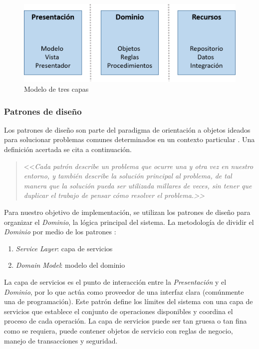 \begin{figure}[h]
\begin{centering}
\includegraphics[width=0.8\columnwidth]{capitulo-5/graphics/arqui_tres_capas}
\par\end{centering}
\caption[Modelo de tres capas]{\label{fig5:tres_capas}Modelo de tres capas}

\end{figure}


\subsubsection{Patrones de diseño}

Los patrones de diseño son parte del paradigma de orientación a objetos
ideados para solucionar problemas comunes determinados en un contexto
particular \cite{Shalloway2004}. Una definición acertada se cita
a continuación.
\begin{quotation}
<<\emph{Cada patrón describe un problema que ocurre una y otra vez
en nuestro entorno, y también describe la solución principal al problema,
de tal manera que la solución pueda ser utilizada millares de veces,
sin tener que duplicar el trabajo de pensar cómo resolver el problema.>>}
\cite{Alexander1977}
\end{quotation}
Para nuestro objetivo de implementación, se utilizan los patrones
de diseño para organizar el \emph{Dominio}, la lógica principal del
sistema. La metodología de dividir el\emph{ Dominio} por medio de
los patrones \cite{Fowler2002}:
\begin{enumerate}
\item \emph{Service Layer}: capa de servicios
\item \emph{Domain Model}: modelo del dominio
\end{enumerate}
La capa de servicios es el punto de interacción entre la \emph{Presentación}
y el\emph{ Dominio}, por lo que actúa como proveedor de una interfaz
clara (comúnmente una  de programación). Este patrón define
los límites del sistema con una capa de servicios que establece el
conjunto de operaciones disponibles y coordina el proceso de cada
operación. La capa de servicios puede ser tan gruesa o tan fina como
se requiera, puede contener objetos de servicio con reglas de negocio,
manejo de transacciones y seguridad.

